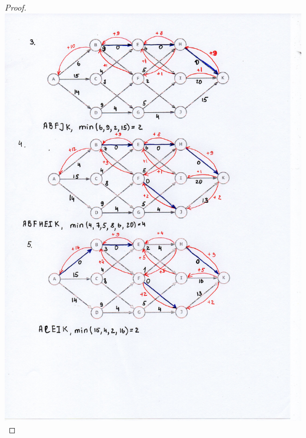 \begin{proof}
    \centering\includegraphics[width=1\linewidth]{pics/14thSolution2.jpg}


\end{proof}
